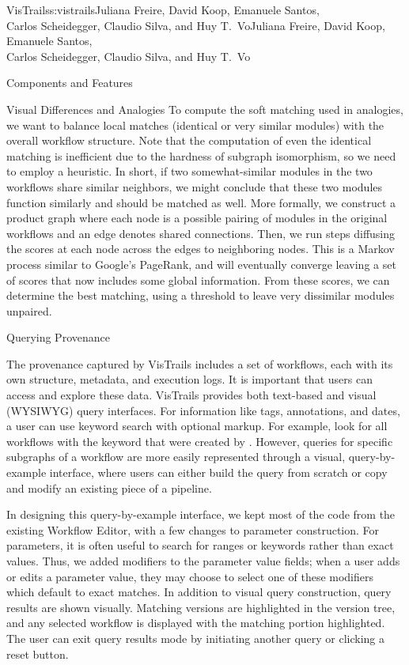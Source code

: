 \begin{aosachaptertoc}{VisTrails}{s:vistrails}{Juliana Freire, David Koop, Emanuele Santos, \\ Carlos Scheidegger, Claudio Silva, and Huy T.\ Vo}{Juliana Freire, David Koop, Emanuele Santos, \\ \hspace*{0.9cm} Carlos Scheidegger, Claudio Silva, and Huy T.\ Vo}
\begin{aosasect1}{Components and Features}
\begin{aosasect2}{Visual Differences and Analogies}
To compute the soft matching used in analogies, we want to balance
local matches (identical or very similar modules) with the overall
workflow structure.  Note that the computation of even the identical
matching is inefficient due to the hardness of subgraph isomorphism,
so we need to employ a heuristic.  In short, if two somewhat-similar
modules in the two workflows share similar neighbors, we might
conclude that these two modules function similarly and should be
matched as well.  More formally, we construct a product graph where
each node is a possible pairing of modules in the original workflows
and an edge denotes shared connections.  Then, we run steps diffusing
the scores at each node across the edges to neighboring nodes.  This
is a Markov process similar to Google's PageRank, and will eventually
converge leaving a set of scores that now includes some global
information.  From these scores, we can determine the best matching,
using a threshold to leave very dissimilar modules unpaired.

\end{aosasect2}

\begin{aosasect2}{Querying Provenance}

The provenance captured by VisTrails includes a set of workflows, each
with its own structure, 
metadata, and execution logs. It is important that users can access
and explore these data.  VisTrails provides both text-based and visual
(WYSIWYG) query interfaces.  For information like tags, annotations,
and dates, a user can use keyword search with optional markup. For
example, look for all workflows with the keyword  that were
created by .  However, queries for specific subgraphs of
a workflow are more easily represented through a visual, query-by-example interface, where users can
either build the query from scratch or copy and modify an existing
piece of a pipeline.

In designing this query-by-example interface, we kept most of the code
from the existing Workflow Editor, with a few changes to parameter
construction.  For parameters, it is often useful to search for ranges
or keywords rather than exact values.  Thus, we added modifiers to the
parameter value fields; when a user adds or edits a parameter value,
they may choose to select one of these modifiers which default to
exact matches.  In addition to visual query construction, query
results are shown visually.  Matching versions are highlighted in the
version tree, and any selected workflow is displayed with the matching
portion highlighted.  The user can exit query results mode by
initiating another query or clicking a reset button.


\end{aosasect2}
\end{aosasect1}
\end{aosachaptertoc}
